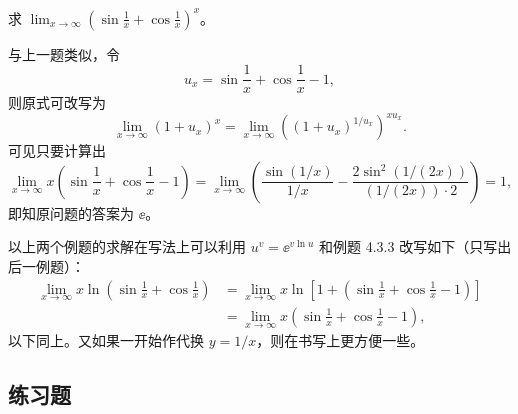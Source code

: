 \begin{xexample}[4.3.5]
求 $\displaystyle\lim_{x\to\infty}\left(\sin\frac1x+\cos\frac1x\right)^x$。
\end{xexample}
\begin{xsolution}
与上一题类似，令
\[
  u_x=\sin\frac1x+\cos\frac1x-1,
\]
则原式可改写为
\[
  \lim_{x\to\infty}(1+u_x)^x
  =\lim_{x\to\infty}\left((1+u_x)^{1/u_x}\right)^{xu_x}.
\]
可见只要计算出
\[
  \lim_{x\to\infty}x\left(\sin\frac1x+\cos\frac1x-1\right)
  =\lim_{x\to\infty}\left(\frac{\sin(1/x)}{1/x}-\frac{2\sin^2(1/(2x))}{(1/(2x))\cdot2}\right)=1,
\]
即知原问题的答案为 $\ee$。
\end{xsolution}

\begin{xremark}
以上两个例题的求解在写法上可以利用 $u^v=\ee^{v\ln u}$ 和例题 4.3.3 改写如下（只写出后一例题）：
\begin{align*}
  \lim_{x\to\infty}x\ln\left(\sin\frac1x+\cos\frac1x\right)
  &=\lim_{x\to\infty}x\ln\left[1+\left(\sin\frac1x+\cos\frac1x-1\right)\right]\\
  &=\lim_{x\to\infty}x\left(\sin\frac1x+\cos\frac1x-1\right),
\end{align*}
以下同上。又如果一开始作代换 $y=1/x$，则在书写上更方便一些。
\end{xremark}

\subsection{练习题}

